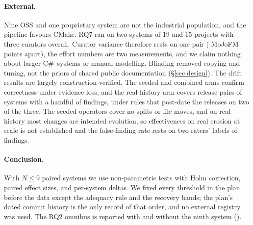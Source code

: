 \paragraph{External.} Nine OSS  and one proprietary
system are not the industrial population, and the pipeline favours CMake. %
RQ7 ran on two systems of 19 and 15 projects with three curators overall. Curator variance therefore rests on one pair
(\rqNineEshopCuratorMoJoSpread{} MoJoFM points apart), the
effort numbers are two measurements, and we claim nothing about larger C\#\ systems or manual
modelling.
Blinding removed copying and tuning, not the
priors of shared public documentation (\S\ref{sec:design}). The drift results are largely
construction-verified. The seeded and combined arms confirm correctness under evidence loss, and
the real-history arm covers \rqSixHistPairs{} release pairs of \rqSixHistSystems{} systems with a
handful of findings, under rules that post-date the releases on two of the three. The seeded
operators cover no splits or file moves, and on real history most changes are intended evolution,
so effectiveness on real erosion at scale is not established and the false-finding rate rests on
two raters' labels of \rqSixHistFindings{} findings.

\paragraph{Conclusion.} With $N\le 9$ paired systems we use non-parametric tests with Holm
correction, paired effect sizes, and per-system deltas. We fixed every threshold in the plan
before the data except the adequacy rule and the recovery bands; the plan's dated commit history
is the only record of that order, and no external registry was used. The RQ2 omnibus is reported
with and without the ninth system (\trStats{}).
